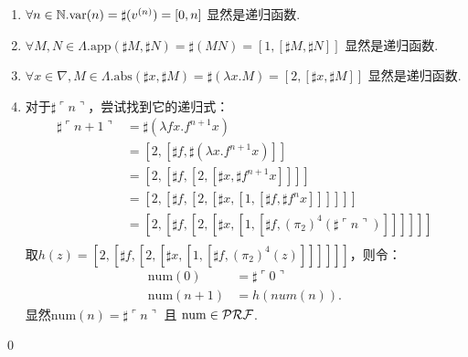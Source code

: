 \begin{pf} \rm \;
\begin{enumerate}
    \item $\forall n\in\mathbb{N}. \mathrm{var}(n)=\sharp (v^{(n)}) = [0, n]$ 显然是递归函数.
    \item $\forall M,N\in\Lambda. \mathrm{app}(\sharp M, \sharp N)=\sharp (M N) = [1, [\sharp M, \sharp N]]$ 显然是递归函数.
    \item $\forall x\in\nabla, M\in\Lambda.\mathrm{abs}(\sharp x, \sharp M) = \sharp (\lambda x.M) = [2,[\sharp x, \sharp M]]$ 显然是递归函数.
    \item 对于$\sharp \ulcorner n\urcorner$，尝试找到它的递归式：
    $$
    \begin{aligned}
        \sharp \ulcorner n+1 \urcorner 
        &= \sharp (\lambda fx.f^{n+1}x) \\
        &= [2, [\sharp f, \sharp (\lambda x.f^{n+1} x)]] \\
        &= [2, [\sharp f, [2, [\sharp x, \sharp  f^{n+1} x]]]] \\
        &= [2, [\sharp f, [2, [\sharp x, [1, [\sharp f, \sharp f^nx]]]]]] \\
        &= [2, [\sharp f, [2, [\sharp x, [1, [\sharp f, (\pi_2)^4(\sharp \ulcorner n \urcorner)]]]]]] \\
    \end{aligned}
    $$
    取$h(z) = [2, [\sharp f, [2, [\sharp x, [1, [\sharp f, (\pi_2)^4(z)]]]]]]$，则令：
    $$
    \begin{aligned}
        \mathrm{num}(0) &= \sharp \ulcorner 0 \urcorner \\
        \mathrm{num}(n+1) &= h(num(n)).
    \end{aligned}
    $$
    显然$\mathrm{num}(n) = \sharp \ulcorner n \urcorner$ 且 $\mathrm{num}\in\mathcal{PRF}$.
\end{enumerate}
    \qed
\end{pf}